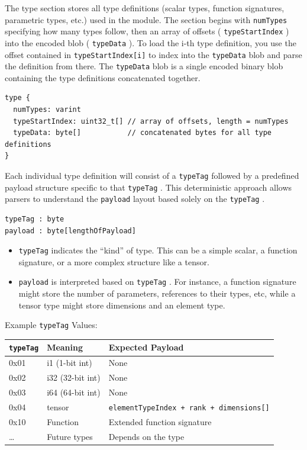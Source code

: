\documentclass{article}
\begin{document}
The type section stores all type definitions (scalar types, function signatures, parametric types, etc.) used in the module. The section begins with \texttt{numTypes} specifying how many types follow, then an array of offsets ( \texttt{typeStartIndex} ) into the encoded blob ( \texttt{typeData} ). To load the i-th type definition, you use the offset contained in \texttt{typeStartIndex[i]} to index into the \texttt{typeData} blob and parse the definition from there. The \texttt{typeData} blob is a single encoded binary blob containing the type definitions concatenated together.


\begin{lstlisting}
type {
  numTypes: varint
  typeStartIndex: uint32_t[] // array of offsets, length = numTypes
  typeData: byte[]           // concatenated bytes for all type definitions
}
\end{lstlisting}

Each individual type definition will consist of a \texttt{typeTag} followed by a predefined payload structure specific to that \texttt{typeTag} . This deterministic approach allows parsers to understand the \texttt{payload} layout based solely on the \texttt{typeTag} .


\begin{lstlisting}
typeTag : byte
payload : byte[lengthOfPayload]
\end{lstlisting}

\begin{itemize}
\item \texttt{typeTag} indicates the ``kind'' of type. This can be a simple scalar, a function signature, or a more complex structure like a tensor.
\item \texttt{payload} is interpreted based on \texttt{typeTag} . For instance, a function signature might store the number of parameters, references to their types, etc, while a tensor type might store dimensions and an element type.

\end{itemize}
Example \texttt{typeTag} Values:


\begin{longtable}{l|l|l}
\hline
\texttt{typeTag} & Meaning & Expected Payload \\ \hline
0x01 & i1 (1-bit int) & None \\ \hline
0x02 & i32 (32-bit int) & None \\ \hline
0x03 & i64 (64-bit int) & None \\ \hline
0x04 & tensor & \texttt{elementTypeIndex + rank + dimensions[]} \\ \hline
0x10 & Function & Extended function signature \\ \hline
… & Future types & Depends on the type \\ \hline
\end{longtable}
\end{document}
